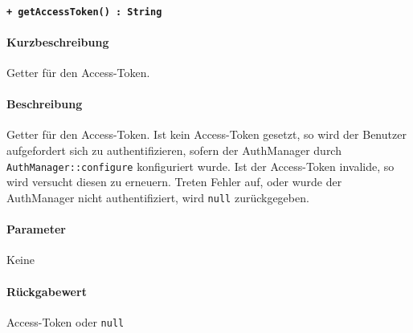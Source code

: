 \paragraph{\texttt{+ getAccessToken() : String}}%
\paragraph*{Kurzbeschreibung}
Getter für den Access-Token.
\paragraph*{Beschreibung}
Getter für den Access-Token.
Ist kein Access-Token gesetzt, so wird der Benutzer aufgefordert sich zu authentifizieren, sofern der AuthManager durch \verb#AuthManager::configure# konfiguriert wurde.
Ist der Access-Token invalide, so wird versucht diesen zu erneuern.
Treten Fehler auf, oder wurde der AuthManager nicht authentifiziert, wird \verb#null# zurückgegeben.
\paragraph*{Parameter}
Keine
\paragraph*{Rückgabewert}
Access-Token oder \verb#null#
